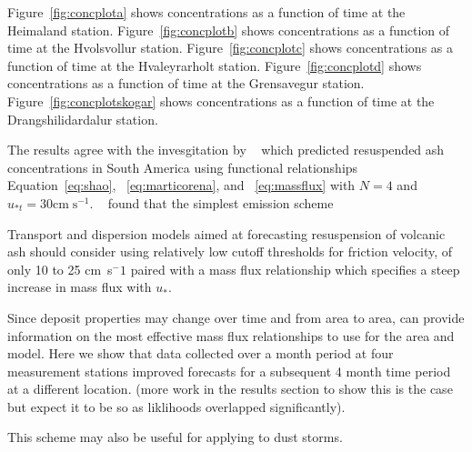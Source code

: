 \documentclass[draft]{agujournal2018}
\begin{document}
Figure~\ref{fig:concplota} shows concentrations as a function of time at the Heimaland station.
Figure~\ref{fig:concplotb} shows concentrations as a function of time at the Hvolsvollur station.
Figure~\ref{fig:concplotc} shows concentrations as a function of time at the Hvaleyrarholt station.
Figure~\ref{fig:concplotd} shows concentrations as a function of time at the Grensavegur station.
Figure~\ref{fig:concplotskogar} shows concentrations as a function of time at the Drangshilidardalur station.


\conclusions  %

The results agree with the invesgitation by ~\cite{Folch14} which predicted resuspended ash concentrations in South America using functional
relationships Equation~\ref{eq:shao}, ~\ref{eq:marticorena}, and ~\ref{eq:massflux} with $N=4$ and $u_{*t}=30\mathrm{cm}\;\mathrm{s}^{-1}$.
~\cite{Folch14} found that the simplest emission scheme 

Transport and dispersion models aimed at forecasting resuspension of volcanic ash should consider using
relatively low cutoff thresholds for friction velocity, of only 10 to 25 cm~s$^-1$ paired with a mass flux
relationship which specifies a steep increase in mass flux with $u_*$. 

Since deposit properties may change over time and from area to area, 
can provide information on the most effective mass flux relationships to use for the area and model. 
Here we show that data collected over a month period at four measurement stations improved forecasts for a subsequent 4 month time period
at a different location.
(more work in the results section to show this is the case but expect it to be so as liklihoods overlapped significantly).

This scheme may also be useful for applying to dust storms.






\end{document}
